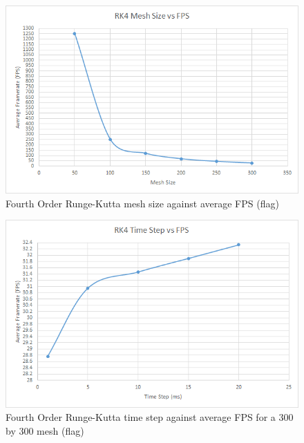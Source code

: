     \begin{figure}
    \begin{center}
      \includegraphics[scale=.9]{Figures/flag_rk4_m_fps}
    \end{center}
    \caption{Fourth Order Runge-Kutta mesh size against average FPS (flag)}
    \label{fig:rk4 mesh fps flag}
  \end{figure}
  
    \begin{figure}
    \begin{center}
      \includegraphics[scale=.9]{Figures/flag_rk4_ts_fps}
    \end{center}
    \caption{Fourth Order Runge-Kutta time step against average FPS for a 300 by 300 mesh (flag)}
    \label{fig:rk4 step fps flag}
  \end{figure}
  
